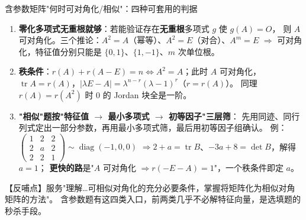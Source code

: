 \begin{fdeep}{含参数矩阵"何时可对角化/相似"：四种可套用的判据}
\begin{enumerate}[leftmargin=1.8em,itemsep=0.2em]
\item \textbf{零化多项式无重根就够}：若能验证存在\textbf{无重根}多项式 $g$ 使 $g(A)=O$，
      则 $A$ 可对角化。三个推论：$A^{2}=A$（幂等）、$A^{2}=E$（对合）、$A^{m}=E$
      $\Longrightarrow$ 可对角化，特征值分别只能是 $\{0,1\}$、$\{1,-1\}$、$m$ 次单位根。
\item \textbf{秩条件}：$r(A)+r(A-E)=n\iff A^{2}=A$；此时 $A$ 可对角化，
      $\operatorname{tr}A=r(A)$，$\lvert\lambda E-A\rvert=\lambda^{n-r}(\lambda-1)^{r}$（$r=r(A)$）。
      同理 $r(A)=r(A^{2})$ 时 $0$ 的 Jordan 块全是一阶。
\item \textbf{"相似"题按"特征值 $\to$ 最小多项式 $\to$ 初等因子"三层筛}：
      先用同迹、同行列式定出一部分参数，再用最小多项式筛，最后用初等因子组确认。
      例：$\begin{pmatrix}1&2&2\\2&a&2\\2&2&1\end{pmatrix}\sim\operatorname{diag}(-1,0,0)$
      $\Rightarrow 2+a=\operatorname{tr}B$、$-3a+8=\det B$，解得 $a=1$；
      \textbf{更快的路}是"$A$ 可对角化 $\Rightarrow r(-E-A)=1$"，一个秩条件即定 $a$。
\end{enumerate}
【反哺点】服务"理解…可相似对角化的充分必要条件，掌握将矩阵化为相似对角矩阵的方法"。
含参数题有这四类入口，前两类几乎不必解特征向量，是选填题的秒杀手段。
\end{fdeep}



